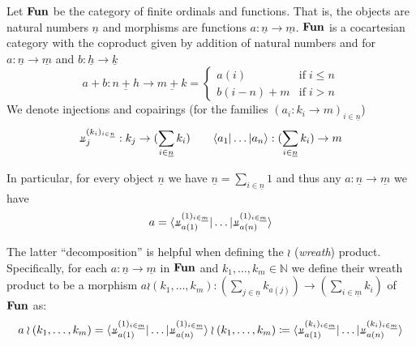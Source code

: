 \documentclass[acmsmall,screen, nonacm, anonymous]{acmart}
\newcommand\rotpi{\rotatebox[origin=c]{180}{$\pi$}}
\begin{document}
\begin{definition}
  Let $\mathbf{Fun}$ be the category of finite ordinals and functions.
  That is, the objects are natural numbers $\underline{n}$ and morphisms are functions $a : \underline{n} \to \underline{m}$.
  $\mathbf{Fun}$ is a cocartesian category with the coproduct given by addition of natural numbers and for $a : \underline{n} \to \underline{m}$ and $b : \underline{h} \to \underline{k}$
  \[
  a + b : \underline{n + h} \to \underline{m + k} = \begin{cases}
    a(i) &\text{if}\; i \leq n\\
    b(i - n) + m &\text{if}\; i > n
  \end{cases}
  \]
We denote injections and copairings (for the families $(a_{i} : k_i \to m)_{i \in \underline{n}}$)
\[
\rotpi^{(k_i)_{i \in \underline{n}}}_j : k_j \to (\sum_{i \in \underline{n}} k_i) \qquad \langle a_1 | \ldots | a_n \rangle : (\sum_{i \in \underline{n}} k_{i}) \to m
\]

In particular, for every object $\underline{n}$ we have $\underline{n} = \sum_{i \in \underline{n}} 1$ and thus any $a : \underline{n} \to \underline{m}$ we have 
\[
a = \langle \rotpi^{(1)_{i \in \underline{m}}}_{a(1)} | \ldots | \rotpi^{(1)_{i \in \underline{m}}}_{a(n)} \rangle
\]
\end{definition}

The latter \enquote{decomposition} is helpful when defining the $\wr$ (\textit{wreath}) product.
Specifically, for each $a : \underline{n} \to \underline{m}$ in $\mathbf{Fun}$ and $k_1, \ldots, k_m \in \mathbb{N}$ we define their wreath product to be a morphism $a \wr (k_1, \ldots, k_m) : (\sum_{j \in \underline{n}}k_{a(j)}) \to (\sum_{i \in \underline{m}} k_i)$ of $\mathbf{Fun}$ as:
\[
a \wr (k_1, \ldots, k_m) = \langle \rotpi^{(1)_{i \in \underline{m}}}_{a(1)} | \ldots | \rotpi^{(1)_{i \in \underline{m}}}_{a(n)} \rangle \wr (k_1, \ldots, k_m) \coloneq \langle \rotpi^{(k_i)_{i \in \underline{m}}}_{a(1)} | \ldots | \rotpi^{(k_i)_{i \in \underline{m}}}_{a(n)} \rangle
\]
\end{document}

